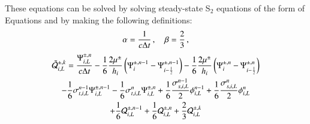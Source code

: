 These equations can be solved by solving steady-state S$_2$ equations
of the form of Equations  and  by making
the following definitions:
\begin{equation}
  \alpha = \frac{1}{c\Delta t} \, , \quad \beta = \frac{2}{3} \, ,
\end{equation}
\begin{multline}
  \tilde{\mathcal{Q}}_{i,L}^{\pm,k}
  = \frac{\Psi_{i,L}^{\pm,n}}{c\Delta t}
  - \frac{1}{6}\frac{2\mu^\pm}{h_i}\left( \Psi_i^{\pm,n-1} - \Psi_{i-\frac{1}{2}}^{\pm,n-1} \right)
  - \frac{1}{6}\frac{2\mu^\pm}{h_i}\left( \Psi_i^{\pm,n} - \Psi_{i-\frac{1}{2}}^{\pm,n} \right)\\
  - \frac{1}{6}\sigma_{t,i,L}^{n-1}\Psi_{i,L}^{\pm,n-1}
  - \frac{1}{6}\sigma_{t,i,L}^n    \Psi_{i,L}^{\pm,n}
  + \frac{1}{6}\frac{\sigma_{s,i,L}^{n-1}}{2}\phi_{i,L}^{n-1}
  + \frac{1}{6}\frac{\sigma_{s,i,L}^n}{2}    \phi_{i,L}^n\\
  + \frac{1}{6}\mathcal{Q}_{i,L}^{\pm,n-1}
  + \frac{1}{6}\mathcal{Q}_{i,L}^{\pm,n}
  + \frac{2}{3}\mathcal{Q}_{i,L}^{\pm,k}
\end{multline}
